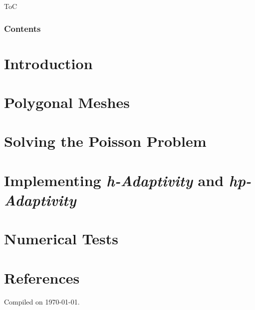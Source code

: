 \documentclass[8pt, compress]{beamer}
\title[\presentationshorttitle]{\presentationtitle}
\subtitle{Advanced Programming for Scientific Computing}
\author[Andrea Di Antonio]{Andrea Di Antonio \\ Supervised by Professors Paola F. Antonietti and Marco Verani} %
\date[September 10, 2024]{Exam session of September 10, 2024 \\ Academic Year 2023-24}
\begin{document}
    \begin{frame}
        \titlepage
    \end{frame} %

	\begin{frame}{ToC}
		\frametitle{Contents}
		\tableofcontents[hideallsubsections]
	\end{frame}

	\section{Introduction}
	

	\section{Polygonal Meshes}
	

	\section{Solving the Poisson Problem}
	

	\section{Implementing \textit{h-Adaptivity} and \textit{hp-Adaptivity}}
	

	\section{Numerical Tests}
	

	\section*{References}
	\begin{frame}[allowframebreaks]
		\nocite{*}
		\printbibliography
	\end{frame}

	\begin{frame}
		\thispagestyle{empty}
		\begin{center}
			Compiled on \today.
		\end{center}
	\end{frame}
\end{document}
